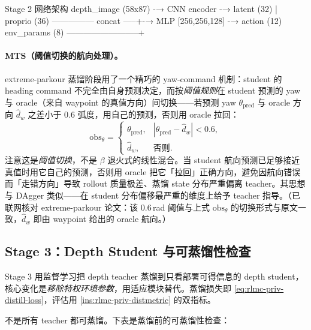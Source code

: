 \begin{codebox}[text]{Stage 2 网络架构}
depth_image (58x87) -→ CNN encoder -→ latent (32)
                                          |
proprio (36) --------------- concat -----+-→ MLP [256,256,128] -→ action (12)
env_params (8) --------------------------+
\end{codebox}

\paragraph{MTS（阈值切换的航向处理）。} extreme-parkour 蒸馏阶段用了一个精巧的 yaw-command 机制：student 的 heading command 不完全由自身预测决定，而按\emph{阈值规则}在 student 预测的 yaw 与 oracle（来自 waypoint 的真值方向）间切换——若预测 yaw $\theta_{\text{pred}}$ 与 oracle 方向 $\hat d_w$ 之差小于 0.6 弧度，用自己的预测，否则用 oracle 拉回：
\begin{equation}
\text{obs}_\theta =
\begin{cases}
\theta_{\text{pred}}, & |\theta_{\text{pred}} - \hat d_w| < 0.6,\\[2pt]
\hat d_w, & \text{否则}.
\end{cases}
\label{eq:rlmc-priv-mts}
\end{equation}
注意这是\emph{阈值切换}，不是 $\beta$ 退火式的线性混合。当 student 航向预测已足够接近真值时用它自己的预测，否则用 oracle 把它「拉回」正确方向，避免因航向错误而「走错方向」导致 rollout 质量极差、蒸馏 state 分布严重偏离 teacher。其思想与 DAgger 类似——在 student 分布偏移最严重的维度上给予 teacher 指导。（已联网核对 extreme-parkour 论文：该 $0.6$\,rad 阈值与上式 $\mathrm{obs}_\theta$ 的切换形式与原文一致，$\hat d_w$ 即由 waypoint 给出的 oracle 航向。）

\subsection{Stage 3：Depth Student 与可蒸馏性检查}
\label{sec:rlmc-priv-stage3}

Stage 3 用监督学习把 depth teacher 蒸馏到只看部署可得信息的 depth student，核心变化是\emph{移除特权环境参数}，用适应模块替代。蒸馏损失即 \cref{eq:rlmc-priv-distill-loss}，评估用 \cref{ins:rlmc-priv-distmetric} 的双指标。

不是所有 teacher 都可蒸馏。下表是蒸馏前的可蒸馏性检查：

